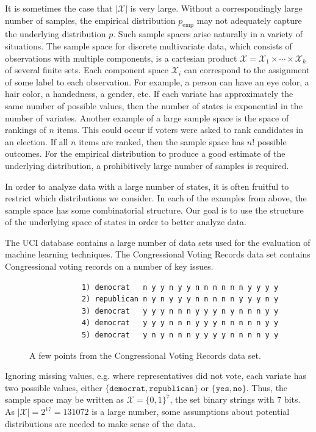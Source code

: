 \documentclass[cclicense]{hmcthesis}
\providecommand*{\xs}{\mathcal X}
\newcommand*{\emp}{\mathrm{emp}}
\numberwithin{equation}{chapter}
\numberwithin{thmcounter}{chapter}
\begin{document}
    It is sometimes the case that $|\xs|$ is very large.  Without a
    correspondingly large number of samples, the empirical distribution $p_\emp$
    may not adequately capture the underlying distribution $p$.  Such sample
    spaces arise naturally in a variety of situations.  The sample space for
    discrete multivariate data, which consists of observations with multiple
    components, is a cartesian product $\xs = \xs_1 \times \cdots \times \xs_k$
    of several finite sets.  Each component space $\xs_i$ can correspond to the
    assignment of some label to each observation.  For example, a person can
    have an eye color, a hair color, a handedness, a gender, etc.  If each
    variate has approximately the same number of possible values, then the
    number of states is exponential in the number of variates.  Another example
    of a large sample space is the space of rankings of $n$ items.  This could
    occur if voters were asked to rank candidates in an election.  If all $n$
    items are ranked, then the sample space has $n!$ possible outcomes.  For the
    empirical distribution to produce a good estimate of the underlying
    distribution, a prohibitively large number of samples is required.

    In order to analyze data with a large number of states, it is often fruitful
    to restrict which distributions we consider.  In each of the examples from
    above, the sample space has some combinatorial structure.  Our goal is to
    use the structure of the underlying space of states in order to better
    analyze data.

    \begin{example}
        The UCI database \citep{UCIData} contains a large number of data sets
        used for the evaluation of machine learning techniques.  The
        Congressional Voting Records data set contains Congressional voting
        records on a number of key issues.
        \begin{figure}[H]
            \centering
            \begin{verbatim}
            1) democrat   n y y n y y n n n n n n y y y y
            2) republican n y n y y y n n n n n y y y n y
            3) democrat   y y y n n n y y y n y n n n y y
            4) democrat   y y y n n n y y y n n n n n y y
            5) democrat   y n y n n n y y y y n n n n y y
            \end{verbatim}
            \vspace{-1.5\baselineskip}
            \caption{A few points from the Congressional Voting Records
            data set.}
        \end{figure}
        \noindent Ignoring missing values, e.g. where representatives did not
        vote, each variate has two possible values, either $\{\texttt{democrat},
        \texttt{republican}\}$ or $\{\texttt{yes}, \texttt{no}\}$.  Thus, the
        sample space may be written as $\xs = \{0, 1\}^7$, the set binary
        strings with 7 bits.  As $|\xs| = 2^{17} = 131072$ is a large number,
        some assumptions about potential distributions are needed to make sense
        of the data.
        \label{ex:voting}
    \end{example}
\end{document}

